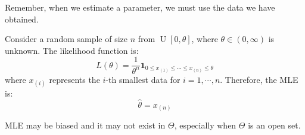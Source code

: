 \documentclass{huhtakm-template-book-v2}
\DeclareMathOperator{\U}{U}
\begin{document}
\begin{rem}
	Remember, when we estimate a parameter, we must use the data we have obtained.
\end{rem}
\begin{eg}
	Consider a random sample of size $n$ from $\U[0,\theta]$, where $\theta\in(0,\infty)$ is unknown. The likelihood function is:
	\begin{equation*}
		L(\theta)=\frac{1}{\theta^{n}}\mathbf{1}_{0\leq x_{(1)}\leq\cdots\leq x_{(n)}\leq\theta}
	\end{equation*}
	where $x_{(i)}$ represents the $i$-th smallest data for $i=1,\cdots,n$. Therefore, the MLE is:
	\begin{equation*}
		\hat{\theta}=x_{(n)}
	\end{equation*}
\end{eg}
\begin{rem}
	MLE may be biased and it may not exist in $\Theta$, especially when $\Theta$ is an open set.
\end{rem}
\end{document}
